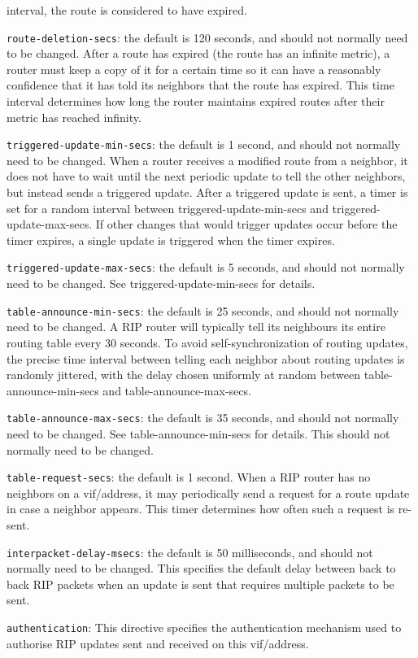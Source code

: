 \begin{description}
\begin{description}
  interval, the route is considered to have expired.
\item{\tt route-deletion-secs}: the default is 120 seconds, and should
  not normally need to be changed.  After a route has expired (the
  route has an infinite metric), a router must keep a copy of it for a
  certain time so it can have a reasonably confidence that it has told
  its neighbors that the route has expired.  This time interval
  determines how long the router maintains expired routes after their
  metric has reached infinity.
\item{\tt triggered-update-min-secs}: the default is 1 second, and
  should not normally need to be changed.  When a router receives a
  modified route from a neighbor, it does not have to wait until the
  next periodic update to tell the other neighbors, but instead sends
  a triggered update.  After a triggered update is sent, a timer is
  set for a random interval between {\stt triggered-update-min-secs}
  and {\stt triggered-update-max-secs}.  If other changes that would
  trigger updates occur before the timer expires, a single update is
  triggered when the timer expires.
\item{\tt triggered-update-max-secs}: the default is 5 seconds, and
  should not normally need to be changed. See {\stt
  triggered-update-min-secs} for details.
\item{\tt table-announce-min-secs}: the default is 25 seconds, and
  should not normally need to be changed. A RIP router will typically
  tell its neighbours its entire routing table every 30 seconds.  To
  avoid self-synchronization of routing updates, the precise time
  interval between telling each neighbor about routing updates is
  randomly jittered, with the delay chosen uniformly at random between
  {\stt table-announce-min-secs} and {\stt table-announce-max-secs}.
\item{\tt table-announce-max-secs}: the default is 35 seconds, and
  should not normally need to be changed. See {\stt
  table-announce-min-secs} for details.  This should not normally need
  to be changed.
\item{\tt table-request-secs}: the default is 1 second.  When a RIP
  router has no neighbors on a vif/address, it may periodically send a
  request for a route update in case a neighbor appears.  This timer
  determines how often such a request is re-sent.
\item{\tt interpacket-delay-msecs}: the default is 50 milliseconds,
  and should not normally need to be changed.  This specifies the
  default delay between back to back RIP packets when an update is
  sent that requires multiple packets to be sent.
\item{\tt authentication}: This directive specifies the authentication
mechanism used to authorise RIP updates sent and received on this
vif/address.  


\end{description}
\end{description}
